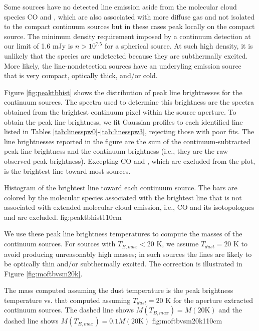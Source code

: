 \documentclass{emulateapj}
\begin{document}
Some sources have no detected line emission aside from the molecular cloud
species CO and \formaldehyde, which are also associated with more diffuse gas
and not isolated to the compact continuum sources but in these cases peak
locally on the compact source.  The minimum density requirement imposed by a
continuum detection at our limit of 1.6 mJy is $n>10^{7.5}$ \percc for a
spherical source.  At such high density, it is unlikely that the species are
undetected because they are subthermally excited.  More likely, the
line-nondetection sources have an underyling emission source that is very
compact, optically thick, and/or cold.

Figure \ref{fig:peaktbhist} shows the distribution of peak line brightnesses
for the continuum sources.  The spectra used to determine this brightness are
the spectra obtained from the brightest continuum pixel within the source
aperture.  To obtain the peak line brightness, we fit Gaussian profiles to each
identified line listed in Tables \ref{tab:linesspw0}-\ref{tab:linesspw3},
rejecting those with poor fits.  The line brightnesses reported in the figure
are the sum of the continuum-subtracted peak line brightness and the continuum
brightness (i.e., they are the raw observed peak brightness).  Excepting CO and
\formaldehyde, which are excluded from the plot, \methanol is the brightest
line toward most sources. 

{Histogram of the brightest line toward each continuum source.
The bars are colored by the molecular species associated with the brightest
line that is not associated with extended molecular cloud emission,
i.e., CO and its isotopologues and \formaldehyde are excluded.}
{fig:peaktbhist}{1}{10cm}

We use these peak line brightness temperatures to compute the masses of the
continuum sources.  For sources with $T_{B,max} < 20$ K, we assume $T_{dust} =
20$ K to avoid producing unreasonably high masses; in such sources the lines
are likely to be optically thin and/or subthermally excited.  The correction is
illustrated in Figure \ref{fig:moftbvsm20k}.

{The mass computed assuming the dust temperature is the peak brightness
temperature vs. that computed assuming $T_{dust}=20$ K  for the aperture extracted
continuum sources.
The dashed line shows $M(T_{B,max}) =
M(20\textrm{K})$ and the dashed line shows $M(T_{B,max}) = 0.1 
M(20\textrm{K})$ 
}{fig:moftbvsm20k}{1}{10cm}
\end{document}
